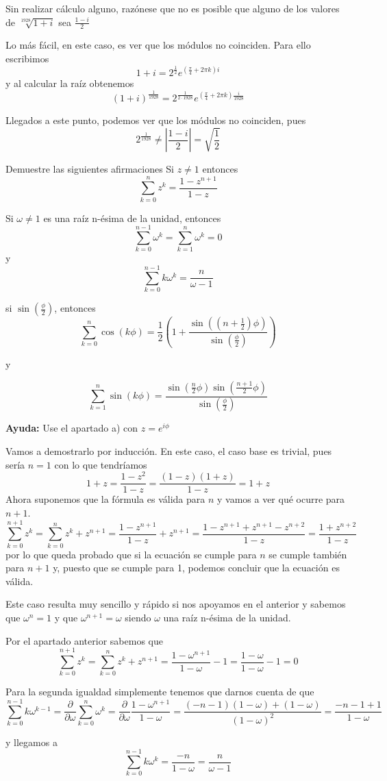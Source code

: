 \begin{problem}[8]
Sin realizar cálculo alguno, razónese que no es posible que alguno de los valores de $\sqrt[1928]{1+i}$ sea $\frac{1-i}{2}$

\solution
Lo más fácil, en este caso, es ver que los módulos no coinciden. Para ello escribimos
\[1+i = 2^{\frac{1}{2}}e^{(\frac{\pi}{4}+2\pi k)i}\]
y al calcular la raíz obtenemos
\[(1+i)^{\frac{1}{1928}} = 2^{\frac{1}{2\cdot 1928}}e^{(\frac{\pi}{4}+2\pi k)\frac{i}{1928}}\]

Llegados a este punto, podemos ver que los módulos no coinciden, pues
\[2^{\frac{1}{1928}}\neq \left|\frac{1-i}{2}\right| = \sqrt{\frac{1}{2}}\]
\end{problem}

\begin{problem}[9]
Demuestre las siguientes afirmaciones
\ppart
Si $z\neq 1$ entonces
\[\sum_{k=0}^n z^k = \frac{1-z^{n+1}}{1-z}\]

\ppart
Si $ω\neq 1$ es una raíz n-ésima de la unidad, entonces
\[\sum_{k=0}^{n-1} ω^k = \sum_{k=1}^n ω^k= 0\]
y
\[\sum_{k=0}^{n-1} k ω^k = \frac{n}{ω-1}\]

\ppart
si $\sin\left(\frac{\phi}{2}\right)$, entonces
\[\sum_{k=0}^n \cos(k\phi) = \frac{1}{2}\left(1+\frac{\sin((n+\frac{1}{2})\phi)}{\sin\left( \frac{\phi}{2}\right)}\right)\]

y

\[\sum_{k=1}^n \sin(k\phi) = \frac{\sin(\frac{n}{2}\phi)\sin(\frac{n+1}{2}\phi)}{\sin(\frac{\phi}{2})}\]

\textbf{Ayuda:} Use el apartado a) con $z=e^{i\phi}$

\solution
\spart
Vamos a demostrarlo por inducción. En este caso, el caso base es trivial, pues sería $n=1$ con lo que tendríamos
\[1+z=\frac{1-z^2}{1-z}=\frac{(1-z)(1+z)}{1-z} = 1+z\]
Ahora suponemos que la fórmula es válida para $n$ y vamos a ver qué ocurre para $n+1$.
\[\sum_{k=0}^{n+1} z^k = \sum_{k=0}^n z^k + z^{n+1} = \frac{1-z^{n+1}}{1-z} + z^{n+1} = \frac{1-z^{n+1}+z^{n+1}-z^{n+2}}{1-z} = \frac{1+z^{n+2}}{1-z}\]
por lo que queda probado que si la ecuación se cumple para $n$ se cumple también para $n+1$ y, puesto que se cumple para 1, podemos concluir que la ecuación es válida.

\spart
Este caso resulta muy sencillo y rápido si nos apoyamos en el anterior y sabemos que $ω^n=1$ y que $ω^{n+1}=ω$ siendo $ω$ una raíz n-ésima de la unidad.

Por el apartado anterior sabemos que
\[\sum_{k=0}^{n+1} z^k = \sum_{k=0}^n z^k + z^{n+1} = \frac{1-ω^{n+1}}{1-ω}-1 = \frac{1-ω}{1-ω}-1 = 0\]

Para la segunda igualdad simplemente tenemos que darnos cuenta de que
\[\sum_{k=0}^{n-1} k ω^{k-1}  = \frac{\partial}{\partial ω} \sum_{k=0}^{n}ω^k = \frac{\partial}{\partial ω} \frac{1-ω^{n+1}}{1-ω} = \frac{(-n-1)(1-ω)+(1-ω)}{(1-ω)^2} = \frac{-n-1+1}{1-ω}\]

y llegamos a
\[\sum_{k=0}^{n-1} k ω^k = \frac{-n}{1-ω}=\frac{n}{ω-1}\]
\spart


\end{problem}

